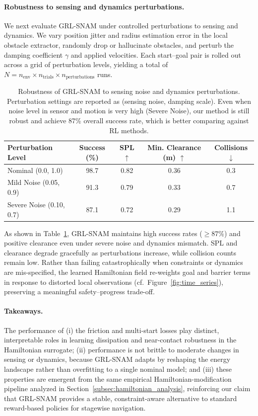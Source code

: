 \documentclass{article} %
\begin{document}
\paragraph{Robustness to sensing and dynamics perturbations.}
We next evaluate GRL-SNAM under controlled perturbations to sensing and dynamics.
We vary position jitter and radius estimation error in the local obstacle extractor, randomly drop or hallucinate obstacles, and perturb the damping coefficient $\gamma$ and applied velocities.
Each start–goal pair is rolled out across a grid of perturbation levels, yielding a total of $N = n_{\text{env}} \times n_{\text{trials}} \times n_{\text{perturbations}}$ runs.

\begin{table}[htbp]
\centering
\caption{Robustness of GRL-SNAM to sensing noise and dynamics perturbations.
Perturbation settings are reported as (sensing noise, damping scale). { Even when noise level in sensor and motion is very high (Severe Noise), our method is still robust and achieve 87\% overall success rate, which is better comparing against RL methods.}}
\label{tab:robustness}
\vspace{0.5em}
\begin{tabular}{lcccc}
\toprule
Perturbation Level & Success (\%) & SPL $\uparrow$ & Min. Clearance (m) $\uparrow$ & Collisions $\downarrow$ \\
\midrule
Nominal (0.0, 1.0)      & 98.7 & 0.82 & 0.36 & 0.3 \\
Mild Noise (0.05, 0.9)  & 91.3 & 0.79 & 0.33 & 0.7 \\
Severe Noise (0.10, 0.7) & 87.1 & 0.72 & 0.29 & 1.1 \\
\bottomrule
\end{tabular}
\end{table}

As shown in Table~\ref{tab:robustness}, GRL-SNAM maintains high success rates ($\geq 87\%$) and positive clearance even under severe noise and dynamics mismatch.
SPL and clearance degrade gracefully as perturbations increase, while collision counts remain low.
Rather than failing catastrophically when constraints or dynamics are mis-specified, the learned Hamiltonian field re-weights goal and barrier terms in response to distorted local observations (cf.\ Figure~\ref{fig:time_series}), preserving a meaningful safety–progress trade-off.

\paragraph{Takeaways.}
The performance of
(i) the friction and multi-start losses play distinct, interpretable roles in learning dissipation and near-contact robustness in the Hamiltonian surrogate;
(ii) performance is not brittle to moderate changes in sensing or dynamics, because GRL-SNAM adapts by reshaping the energy landscape rather than overfitting to a single nominal model; and
(iii) these properties are emergent from the same empirical Hamiltonian-modification pipeline analyzed in Section~\ref{subsec:hamiltonian_analysis}, reinforcing our claim that GRL-SNAM provides a stable, constraint-aware alternative to standard reward-based policies for stagewise navigation.
\end{document}
